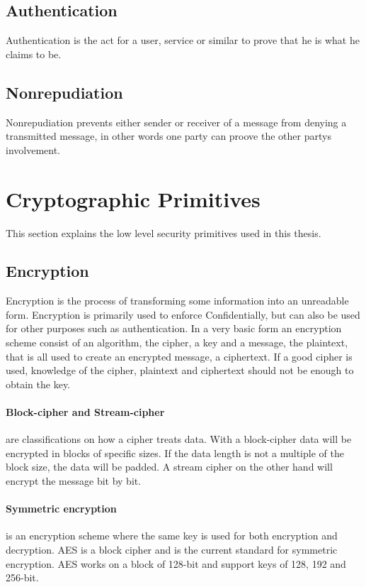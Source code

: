 \documentclass[english,12pt,a4paper]{book}
\begin{document}
\subsection{Authentication}
Authentication is the act for a user, service or similar to prove that he is
what he claims to be\cite[p. 18]{stallings}. 

\subsection{Nonrepudiation}
Nonrepudiation prevents either sender or receiver of a message from denying a
transmitted message, in other words one party can proove the other partys
involvement\cite[p. 19]{stallings}.

\section{Cryptographic Primitives}
This section explains the low level security primitives used in this thesis.

\subsection{Encryption}
Encryption is the process of transforming some information into an unreadable
form. Encryption is primarily used to enforce Confidentially, but can also be
used for other purposes such as authentication. In a very basic form an
encryption scheme consist of an algorithm, the cipher, a key and a message, the
plaintext, that is all used to create an encrypted message, a ciphertext. If
a good cipher is used, knowledge of the cipher, plaintext and ciphertext should
not be enough to obtain the key.

\paragraph{Block-cipher and Stream-cipher} are classifications on how a cipher
treats data. With a block-cipher data will be encrypted in blocks of specific
sizes. If the data length is not a multiple of the block size, the data will be
padded. A stream cipher on the other hand will encrypt the message bit by bit.

\paragraph{Symmetric encryption} is an encryption scheme where the same key is
used for both encryption and decryption. \ac{AES} is a block cipher and is the
current standard for symmetric encryption. \ac{AES} works on a block of 128-bit
and support keys of 128, 192 and 256-bit. 
\end{document}
